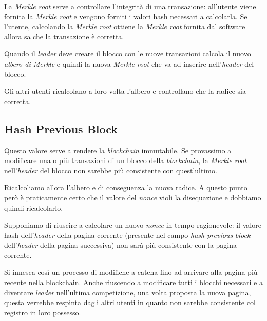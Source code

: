 La \emph{Merkle root} serve a controllare l'integrit\`a di una transazione: all'utente viene fornita la
\emph{Merkle root} e vengono forniti i valori hash necessari a calcolarla. Se l'utente, calcolando la \emph{Merkle root}
ottiene la \emph{Merkle root} fornita dal software allora sa che la transazione \`e corretta.

Quando il \emph{leader} deve creare il blocco con le nuove transazioni calcola il nuovo \emph{albero di Merkle} e quindi
la nuova \emph{Merkle root} che va ad inserire nell'\emph{header} del blocco.

Gli altri utenti ricalcolano a loro volta l'albero e controllano che la radice sia corretta.

\subsection{Hash Previous Block}
Questo valore serve a rendere la \emph{blockchain} immutabile. Se provassimo a modificare una o pi\`u transazioni di
un blocco della \emph{blockchain}, la \emph{Merkle root} nell'\emph{header} del blocco non sarebbe pi\`u consistente
con quest'ultimo.

Ricalcoliamo allora l'albero e di conseguenza la nuova radice. A questo punto per\`o \`e praticamente certo che il
valore del \emph{nonce} violi la disequazione e dobbiamo quindi ricalcolarlo.

Supponiamo di riuscire a calcolare un nuovo \emph{nonce} in tempo ragionevole: il valore hash dell'\emph{header} della
pagina corrente (presente nel campo \emph{hash previous block} dell'\emph{header} della pagina successiva) non sar\`a
pi\`u consistente con la pagina corrente.

Si innesca cos\`i un processo di modifiche a catena fino ad arrivare alla pagina pi\`u recente nella blockchain. Anche
riuscendo a modificare tutti i blocchi necessari e a diventare \emph{leader} nell'ultima competizione, una volta
proposta la nuova pagina, questa verrebbe respinta dagli altri utenti in quanto non sarebbe consistente col registro
in loro possesso.


